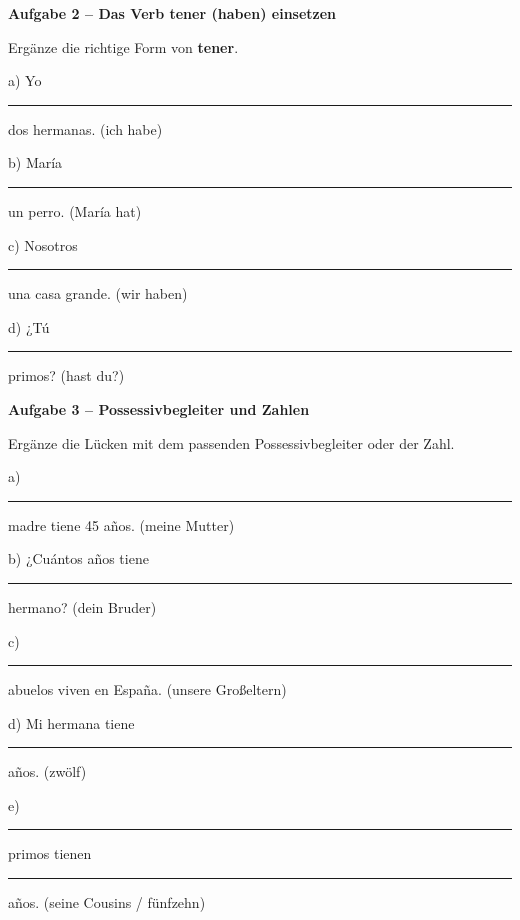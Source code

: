 \documentclass[11pt, a4paper]{article}
\newcommand{\fachfarbe}{spanisch}
\newcommand{\punktebox}[1]{\hfill\fbox{\small \_/#1}}
\newcommand{\luecke}[1]{\rule{#1}{0.4pt}}
\newenvironment{aufgabe}[1]{%
    \needspace{5\baselineskip}%
    \nopagebreak[4]%
    \vspace{10pt}
    \noindent\textbf{\textcolor{\fachfarbe}{Aufgabe #1}}
    \nopagebreak[4]%
    \vspace{5pt}
    \nopagebreak[4]%
    \begin{list}{}{\leftmargin=0pt}
    \item[]
}{%
    \end{list}
}
\newcommand{\es}[1]{\textcolor{\fachfarbe}{\textbf{#1}}}
\begin{document}
\begin{aufgabe}{2 -- Das Verb \es{tener} (haben) einsetzen}
Ergänze die richtige Form von \es{tener}. \punktebox{4}
\end{aufgabe}

\noindent
a) Yo \luecke{2.5cm} dos hermanas. \hfill (ich habe)

\vspace{0.8em}

\noindent
b) María \luecke{2.5cm} un perro. \hfill (María hat)

\vspace{0.8em}

\noindent
c) Nosotros \luecke{2.5cm} una casa grande. \hfill (wir haben)

\vspace{0.8em}

\noindent
d) ¿Tú \luecke{2.5cm} primos? \hfill (hast du?)

\vspace{15pt}


\begin{aufgabe}{3 -- Possessivbegleiter und Zahlen}
Ergänze die Lücken mit dem passenden Possessivbegleiter oder der Zahl. \punktebox{6}
\end{aufgabe}

\noindent
a) \luecke{2cm} madre tiene 45 años. \hfill (meine Mutter)

\vspace{0.8em}

\noindent
b) ¿Cuántos años tiene \luecke{2cm} hermano? \hfill (dein Bruder)

\vspace{0.8em}

\noindent
c) \luecke{2cm} abuelos viven en España. \hfill (unsere Großeltern)

\vspace{0.8em}

\noindent
d) Mi hermana tiene \luecke{2cm} años. \hfill (zwölf)

\vspace{0.8em}

\noindent
e) \luecke{2cm} primos tienen \luecke{2cm} años. \hfill (seine Cousins / fünfzehn)

\vspace{15pt}
\end{document}
